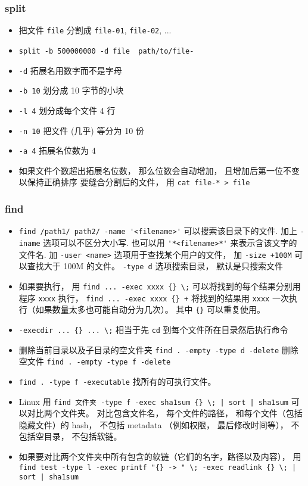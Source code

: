 \subsubsection{split}
\begin{itemize}
\item 把文件 \verb`file` 分割成 \verb`file-01`, \verb`file-02`, ...
\item \verb`split -b 500000000 -d file  path/to/file-`
\item \verb`-d` 拓展名用数字而不是字母
\item \verb`-b 10` 划分成 10 字节的小块
\item \verb`-l 4` 划分成每个文件 4 行
\item \verb`-n 10` 把文件 (几乎) 等分为 10 份
\item \verb`-a 4` 拓展名位数为 4
\item 如果文件个数超出拓展名位数， 那么位数会自动增加， 且增加后第一位不变以保持正确排序
要缝合分割后的文件， 用 \verb`cat file-* > file`
\end{itemize}


\subsubsection{find}
\begin{itemize}
\item \verb`find /path1/ path2/ -name '<filename>'` 可以搜索该目录下的文件. 加上 \verb`-iname` 选项可以不区分大小写. 也可以用 \verb`'*<filename>*'` 来表示含该文字的文件名. 加 \verb`-user <name>` 选项用于查找某个用户的文件， 加 \verb`-size +100M` 可以查找大于 100M 的文件。 \verb`-type d` 选项搜索目录， 默认是只搜索文件
\item 如果要执行， 用 \verb`find ... -exec xxxx {} \;` 可以将找到的每个结果分别用程序 \verb`xxxx` 执行， \verb`find ... -exec xxxx {} +` 将找到的结果用 \verb`xxxx` 一次执行（如果数量太多也可能自动分为几次）。 其中 \verb`{}` 可以重复使用。
\item \verb`-execdir ... {} ... \;` 相当于先 \verb`cd` 到每个文件所在目录然后执行命令
\item 删除当前目录以及子目录的空文件夹 \verb`find . -empty -type d -delete` 删除空文件 \verb`find . -empty -type f -delete`
\item \verb|find . -type f -executable| 找所有的可执行文件。
\item Linux 用 \verb`find 文件夹 -type f -exec sha1sum {} \; | sort | sha1sum` 可以对比两个文件夹。 对比包含文件名， 每个文件的路径， 和每个文件（包括隐藏文件）的 hash， 不包括 metadata （例如权限， 最后修改时间等）， 不包括空目录， 不包括软链。
\item 如果要对比两个文件夹中所有包含的软链（它们的名字，路径以及内容）， 用 \verb`find test -type l -exec printf "{} -> " \; -exec readlink {} \; | sort | sha1sum`
\end{itemize}

